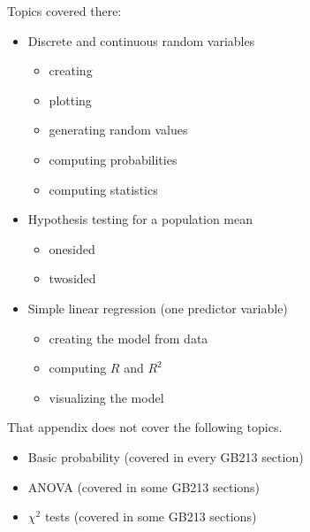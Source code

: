 \documentclass[letterpaper,10pt,english]{jupyterBook}
\begin{document}
\sphinxAtStartPar
Topics covered there:
\begin{itemize}
\item {} 
\sphinxAtStartPar
Discrete and continuous random variables
\begin{itemize}
\item {} 
\sphinxAtStartPar
creating

\item {} 
\sphinxAtStartPar
plotting

\item {} 
\sphinxAtStartPar
generating random values

\item {} 
\sphinxAtStartPar
computing probabilities

\item {} 
\sphinxAtStartPar
computing statistics

\end{itemize}

\item {} 
\sphinxAtStartPar
Hypothesis testing for a population mean
\begin{itemize}
\item {} 
\sphinxAtStartPar
one\sphinxhyphen{}sided

\item {} 
\sphinxAtStartPar
two\sphinxhyphen{}sided

\end{itemize}

\item {} 
\sphinxAtStartPar
Simple linear regression (one predictor variable)
\begin{itemize}
\item {} 
\sphinxAtStartPar
creating the model from data

\item {} 
\sphinxAtStartPar
computing \(R\) and \(R^2\)

\item {} 
\sphinxAtStartPar
visualizing the model

\end{itemize}

\end{itemize}

\sphinxAtStartPar
That appendix does not cover the following topics.
\begin{itemize}
\item {} 
\sphinxAtStartPar
Basic probability (covered in every GB213 section)

\item {} 
\sphinxAtStartPar
ANOVA (covered in some GB213 sections)

\item {} 
\sphinxAtStartPar
\(\chi^2\) tests (covered in some GB213 sections)

\end{itemize}
\end{document}
